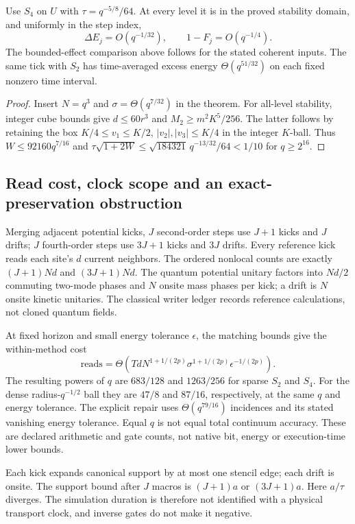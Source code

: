 \begin{corollary}
\label{cor:m1-vacuum-repair}
Use $S_4$ on $U$ with $\tau=q^{-5/8}/64$. At every level it is in the
proved stability domain, and uniformly in the step index,
\[
 \Delta E_j=O(q^{-1/32}),\qquad 1-F_j=O(q^{-1/4}).
\]
The bounded-effect comparison above follows for the stated coherent inputs.
The same tick with $S_2$ has time-averaged excess energy
$\Theta(q^{51/32})$ on each fixed nonzero time interval.
\end{corollary}
\begin{proof}
Insert $N=q^3$ and $\sigma=\Theta(q^{7/32})$ in the theorem. For all-level
stability, integer cube bounds give $d\le60r^3$ and
$M_2\ge m^2K^5/256$. The latter follows by retaining the box
$K/4\le v_1\le K/2$, $|v_2|,|v_3|\le K/4$ in the integer $K$-ball.
Thus $W\le92160q^{7/16}$ and
$\tau\sqrt{1+2W}\le\sqrt{184321}\,q^{-13/32}/64<1/10$ for $q\ge2^{16}$.
\end{proof}

\subsection{Read cost, clock scope and an exact-preservation obstruction}

Merging adjacent potential kicks, $J$ second-order steps use $J+1$ kicks
and $J$ drifts; $J$ fourth-order steps use $3J+1$ kicks and $3J$ drifts.
Every reference kick reads each site's $d$ current neighbors. The ordered
nonlocal counts are exactly $(J+1)Nd$ and $(3J+1)Nd$. The quantum potential
unitary factors into $Nd/2$ commuting two-mode phases and $N$ onsite mass
phases per kick; a drift is $N$ onsite kinetic unitaries. The classical
writer ledger records reference calculations, not cloned quantum fields.

At fixed horizon and small energy tolerance $\epsilon$, the matching bounds
give the within-method cost
\[
 \mathrm{reads}=\Theta\!\left(
 T d N^{1+1/(2p)}\sigma^{1+1/(2p)}\epsilon^{-1/(2p)}\right).
\]
The resulting powers of $q$ are $683/128$ and $1263/256$ for sparse $S_2$
and $S_4$. For the dense radius-$q^{-1/2}$ ball they are $47/8$ and $87/16$,
respectively, at the same $q$ and energy tolerance. The explicit repair uses
$\Theta(q^{79/16})$ incidences and its stated vanishing energy tolerance.
Equal $q$ is not equal total continuum accuracy. These are declared arithmetic
and gate counts, not native bit, energy or execution-time lower bounds.

Each kick expands canonical support by at most one stencil edge; each drift
is onsite. The support bound after $J$ macros is $(J+1)a$ or $(3J+1)a$.
Here $a/\tau$ diverges. The simulation duration is therefore not identified
with a physical transport clock, and inverse gates do not make it negative.

